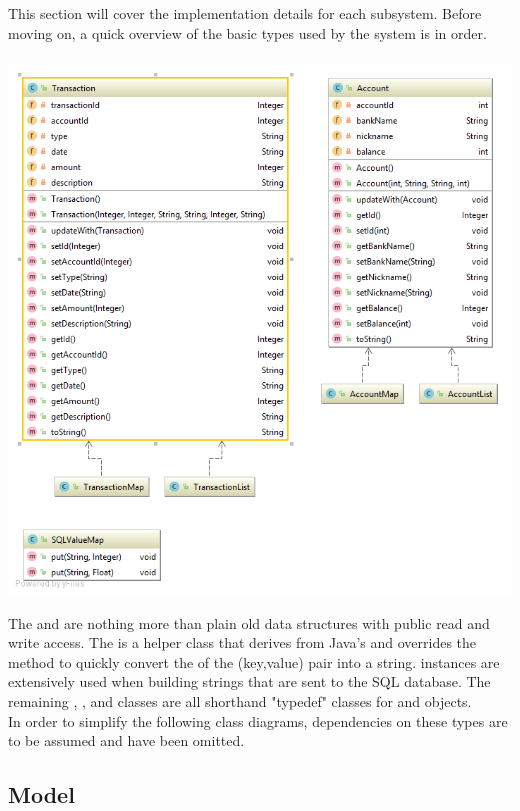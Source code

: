 \documentclass[12pt]{article}
\begin{document}
This section will cover the implementation details for each subsystem. Before moving on, a quick overview of the basic types used by the system is in order.\\
\\
\includegraphics[width=\textwidth,height=\textheight,keepaspectratio]{Diagrams/UML/Types.png}
\bigskip

The  and  are nothing more than plain old data structures with public read and write access. The  is a helper class  that derives from Java's  and overrides the  method to quickly convert the  of the (key,value) pair into a string.  instances are extensively used when building strings that are sent to the SQL database. The remaining , ,  and  classes are all shorthand "typedef" classes for  and  objects.\\

In order to simplify the following class diagrams, dependencies on these types are to be assumed and have been omitted.

\subsection{Model}
\end{document}
